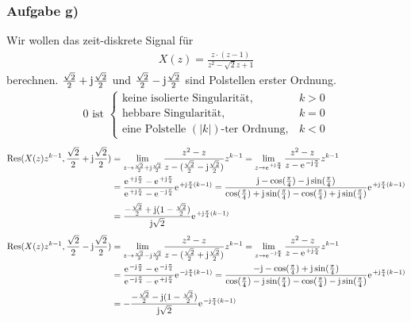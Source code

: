 \subsubsection{Aufgabe g)}
Wir wollen das zeit-diskrete Signal für
\begin{align}
	X(z)=\frac{z\cdot(z-1)}{z^2-\sqrt{2}z+1}
\end{align}
berechnen.
$\frac{\sqrt{2}}{2}+\im\frac{\sqrt{2}}{2}$ und $\frac{\sqrt{2}}{2}-\im\frac{\sqrt{2}}{2}$ sind Polstellen erster Ordnung.
\begin{align}
	0\text{ ist }\begin{cases}
		\text{keine isolierte Singularität}, &k>0 \\
		\text{hebbare Singularität}, &k=0 \\
		\text{eine Polstelle } (|k|)\text{-ter Ordnung}, &k<0
	\end{cases}
\end{align}
\begin{align}
	\mathrm{Res}(X(z)z^{k-1},\frac{\sqrt{2}}{2}+\im\frac{\sqrt{2}}{2})&=\lim\limits_{z\rightarrow\frac{\sqrt{2}}{2}+\im\frac{\sqrt{2}}{2}}\frac{z^2-z}{z-(\frac{\sqrt{2}}{2}-\im\frac{\sqrt{2}}{2})}z^{k-1}=\lim\limits_{z\rightarrow\e^{+\im\frac{\pi}{4}}}\frac{z^2-z}{z-\e^{-\im\frac{\pi}{4}}}z^{k-1}\nonumber\\
	&=\frac{\e^{+\im\frac{\pi}{2}}-\e^{+\im\frac{\pi}{4}}}{\e^{+\im\frac{\pi}{4}}-\e^{-\im\frac{\pi}{4}}}\e^{+\im\frac{\pi}{4}(k-1)}=\frac{\im-\cos(\frac{\pi}{4})-\im\sin(\frac{\pi}{4})}{\cos(\frac{\pi}{4})+\im\sin(\frac{\pi}{4})-\cos(\frac{\pi}{4})+\im\sin(\frac{\pi}{4})}\e^{+\im\frac{\pi}{4}(k-1)}\nonumber\\
	&=\frac{-\frac{\sqrt{2}}{2}+\im(1-\frac{\sqrt{2}}{2})}{\im\sqrt{2}}\e^{+\im\frac{\pi}{4}(k-1)}
\end{align}
\begin{align}
	\mathrm{Res}(X(z)z^{k-1},\frac{\sqrt{2}}{2}-\im\frac{\sqrt{2}}{2})&=\lim\limits_{z\rightarrow\frac{\sqrt{2}}{2}-\im\frac{\sqrt{2}}{2}}\frac{z^2-z}{z-(\frac{\sqrt{2}}{2}+\im\frac{\sqrt{2}}{2})}z^{k-1}=\lim\limits_{z\rightarrow\e^{-\im\frac{\pi}{4}}}\frac{z^2-z}{z-\e^{+\im\frac{\pi}{4}}}z^{k-1}\nonumber\\
	&=\frac{\e^{-\im\frac{\pi}{2}}-\e^{-\im\frac{\pi}{4}}}{\e^{-\im\frac{\pi}{4}}-\e^{+\im\frac{\pi}{4}}}\e^{-\im\frac{\pi}{4}(k-1)}=\frac{-\im-\cos(\frac{\pi}{4})+\im\sin(\frac{\pi}{4})}{\cos(\frac{\pi}{4})-\im\sin(\frac{\pi}{4})-\cos(\frac{\pi}{4})-\im\sin(\frac{\pi}{4})}\e^{+\im\frac{\pi}{4}(k-1)}\nonumber\\
	&=-\frac{-\frac{\sqrt{2}}{2}-\im(1-\frac{\sqrt{2}}{2})}{\im\sqrt{2}}\e^{-\im\frac{\pi}{4}(k-1)}
\end{align}
